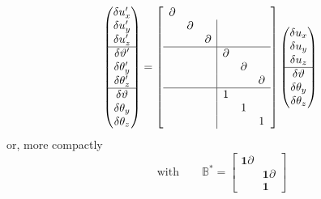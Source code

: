 \begin{equation*}
\begin{pmatrix}
\delta u_x^{\prime} \\
\delta u_y^{\prime} \\
\delta u_z^{\prime} \\ \hline
\delta \vartheta^{\prime} \\ 
\delta \theta_y^{\prime} \\
\delta \theta_z^{\prime} \\ \hline
\delta \vartheta \\ 
\delta \theta_y \\
\delta \theta_z \\
\end{pmatrix}
= \left[\begin{array}{ccc|ccc}
\partial \\
         & \partial &          &           &    &    \\
         &          & \partial &           &    &  \\ \hline
         &          &          & \partial  \\
         &          &          &           & \partial \\
         &          &          &           &          & \partial \\ \hline
& & & 1 \\
& & & & 1 \\
& & & & & 1 \\         
\end{array}\right]\begin{pmatrix}
\delta u_x \\
\delta u_y \\
\delta u_z \\ \hline
\delta \vartheta \\ 
\delta \theta_y \\
\delta \theta_z \\
\end{pmatrix}
\end{equation*}
or, more compactly
\begin{equation}
\qquad\text{with}\qquad
\mathbb{B}^* = \begin{bmatrix}
   \mathbf{1} \partial & \\ %
 & \mathbf{1} \partial  \\
 & \mathbf{1}
\end{bmatrix}
\label{eq:delta-shear-Bstar}
\end{equation}

